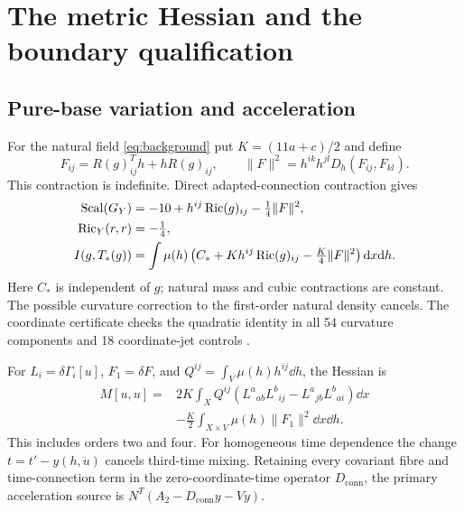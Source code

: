 \section{The metric Hessian and the boundary qualification}
\label{sec:boundary}

\subsection{Pure-base variation and acceleration}
For the natural field \eqref{eq:background} put $K=(11a+c)/2$ and define
\[
 F_{ij}=R(g)_{ij}^Th+hR(g)_{ij},\qquad
 \|F\|^2=h^{ik}h^{jl}D_h(F_{ij},F_{kl}).
\]
This contraction is indefinite. Direct adapted-connection contraction gives
\begin{align}
 \operatorname{Scal}(G_Y)&=-10+h^{ij}\operatorname{Ric}(g)_{ij}-\tfrac14\|F\|^2,
 \nonumber\\
 \operatorname{Ric}_Y(r,r)&=-\tfrac14,\nonumber\\
 I(g,T_*(g))&=\int\mu(h)
 \left(C_*+K h^{ij}\operatorname{Ric}(g)_{ij}-\tfrac K4\|F\|^2\right)\mathrm d x\mathrm d h.
 \label{eq:natural-action}
\end{align}
Here $C_*$ is independent of $g$; natural mass and cubic contractions
are constant. The possible curvature correction to the first-order
natural density cancels. The coordinate certificate checks the quadratic
identity in all 54 curvature components and 18 coordinate-jet controls
\cite{MetricHessian}.

For $L_i=\delta\Gamma_i[u]$, $F_1=\delta F$, and
$Q^{ij}=\int_V\mu(h)h^{ij}\dd h$, the Hessian is
\begin{align}
 M[u,u]={}&2K\int_X Q^{ij}
 (L^a{}_{ab}L^b{}_{ij}-L^a{}_{jb}L^b{}_{ai})\dd x\nonumber\\
 &-\frac K2\int_{X\times V}\mu(h)\|F_1\|^2\dd x\dd h.
 \label{eq:metric-hessian}
\end{align}
This includes orders two and four. For homogeneous time dependence the
change $t=t'-y(h,\ddot u)$ cancels third-time mixing. Retaining every
covariant fibre and time-connection term in the zero-coordinate-time
operator $D_{\mathrm{conn}}$, the primary acceleration source is
$N^T(A_2-D_{\mathrm{conn}}y-Vy)$.

